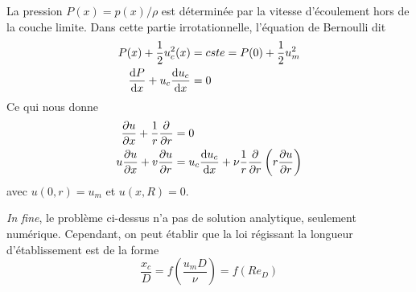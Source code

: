 \documentclass[a4paper,11pt]{report}
\newcommand{\recip}[1]{\frac{1}{#1}}
\begin{document}
    La pression $P(x) = p(x)/\rho$ est déterminée par la vitesse d'écoulement hors de la couche limite. Dans cette partie irrotationnelle, l'équation de Bernoulli dit
    \begin{equation}
      \begin{aligned}
        P(x) +\recip{2} u_c^2(x) &= cste = P(0) + \recip{2}u_m^2\\
        \dv{P}{x} + u_c \dv{u_c}{x} &=0
      \end{aligned}
    \end{equation}
    Ce qui nous donne
    \begin{equation}
      \begin{aligned}
        \pdv{u}{x} + \recip{r} \pdv{}{r}(rv) &= 0\\
        u\pdv{u}{x} + v \pdv{u}{r} &= u_c \dv{u_c}{x} + \nu \recip{r} \pdv{}{r}\left(r\pdv{u}{r}\right)
      \end{aligned}
    \end{equation}
    avec $u(0, r) = u_m$ et $u(x, R)= 0$.

    \textit{In fine}, le problème ci-dessus n'a pas de solution analytique, seulement numérique. Cependant, on peut établir que la loi régissant la longueur d'établissement est de la forme
    \begin{equation}
      \frac{x_c}{D} = f\left(\frac{u_m D}{\nu}\right) = f(Re_D)
    \end{equation}


\begin{appendix}
  
\end{appendix}
\end{document}
